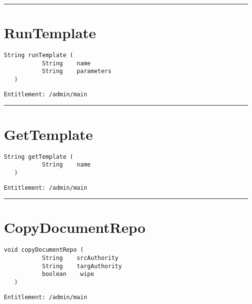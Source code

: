 \rule{12cm}{2pt}
\section{RunTemplate}
\label{Api:RunTemplate}
\begin{lstlisting}[style=nonumbers]
   String runTemplate (
           String    name
           String    parameters
   )
\end{lstlisting}
\begin{Verbatim}[formatcom=\color{Maroon}]
  Entitlement: /admin/main
\end{Verbatim}



\rule{12cm}{2pt}
\section{GetTemplate}
\label{Api:GetTemplate}
\begin{lstlisting}[style=nonumbers]
   String getTemplate (
           String    name
   )
\end{lstlisting}
\begin{Verbatim}[formatcom=\color{Maroon}]
  Entitlement: /admin/main
\end{Verbatim}



\rule{12cm}{2pt}
\section{CopyDocumentRepo}
\label{Api:CopyDocumentRepo}
\begin{lstlisting}[style=nonumbers]
   void copyDocumentRepo (
           String    srcAuthority
           String    targAuthority
           boolean    wipe
   )
\end{lstlisting}
\begin{Verbatim}[formatcom=\color{Maroon}]
  Entitlement: /admin/main
\end{Verbatim}



